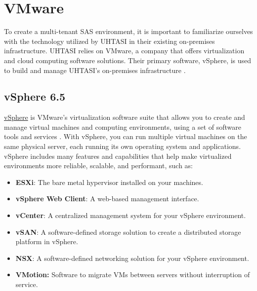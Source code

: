 \section{VMware} \label{section: VMware}

To create a multi-tenant SAS environment, it is important to familiarize ourselves with the technology utilized by UHTASI in their existing on-premises infrastructure. UHTASI relies on VMware, a company that offers virtualization and cloud computing software solutions. Their primary software, vSphere, is used to build and manage UHTASI's on-premises infrastructure \cite{VMware}.

\subsection{vSphere 6.5}
\href{https://www.vmware.com/products/vsphere.html}{vSphere} is VMware's virtualization software suite that allows you to create and manage virtual machines and computing environments, using a set of software tools and services \cite{VMware2}. With vSphere, you can run multiple virtual machines on the same physical server, each running its own operating system and applications. vSphere includes many features and capabilities that help make virtualized environments more reliable, scalable, and performant, such as: 

\begin{itemize}
    \item \textbf{ESXi}: The bare metal hypervisor installed on your machines. 
    \item \textbf{vSphere Web Client}: A web-based management interface. 
    \item \textbf{vCenter}: A centralized management system for your vSphere environment.
    \item \textbf{vSAN}: A software-defined storage solution to create a distributed storage platform in vSphere.
    \item \textbf{NSX}: A software-defined networking solution for your vSphere environment.
    \item \textbf{VMotion:} Software to migrate VMs between servers without interruption of service.
\end{itemize}

